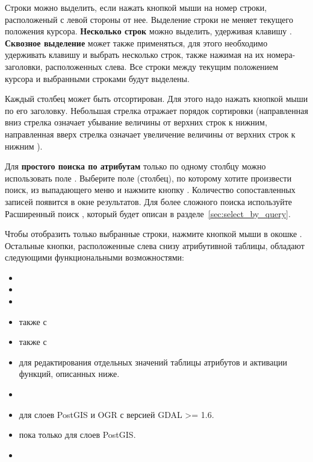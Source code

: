 Строки можно выделить, если нажать кнопкой мыши на номер строки, расположеный
с левой стороны от нее. Выделение строки не меняет текущего положения курсора.
\textbf{Несколько строк} можно выделить, удерживая клавишу .
\textbf{Сквозное выделение} может также применяться, для этого необходимо
удерживать клавишу  и выбрать несколько строк, также
нажимая на их номера-заголовки, расположенных слева. Все строки между
текущим положением курсора и выбранными строками будут выделены.

Каждый столбец может быть отсортирован. Для этого надо нажать кнопкой мыши
по его заголовку. Небольшая стрелка отражает порядок сортировки (направленная
вниз стрелка означает убывание величины от верхних строк к нижним,
направленная вверх стрелка означает увеличение величины от верхних строк
к нижним ).

Для \textbf{простого поиска по атрибутам} только по одному столбцу можно
использовать поле . Выберите поле (столбец), по которому
хотите произвести поиск, из выпадающего меню и нажмите кнопку .
Количество сопоставленных записей появится в окне результатов. Для более
сложного поиска используйте Расширенный поиск , который будет
описан в разделе~\ref{sec:select_by_query}.

Чтобы отобразить только выбранные строки, нажмите кнопкой мыши в окошке
. Остальные кнопки, расположенные
слева снизу атрибутивной таблицы, обладают следующими функциональными
возможностями:

\begin{itemize}[label=--]
\item {}
\item {}
\item {}
\item {}
также с 
\item {}
также с 
\item {} для
редактирования отдельных значений таблицы атрибутов и активации функций,
описанных ниже.
\item {}
\item {} для слоев PostGIS
и OGR с версией GDAL >= 1.6.
\item {} пока только для
слоев PostGIS.
\item {}
\end{itemize}

